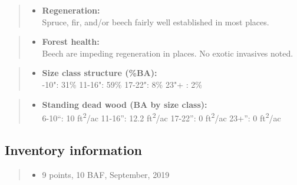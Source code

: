 \documentclass[]{tufte-handout}
\providecommand{\tightlist}{%
  \setlength{\itemsep}{0pt}\setlength{\parskip}{0pt}}
\begin{document}
\begin{quote}
\begin{itemize}
\tightlist
\item
  \textbf{Regeneration:}\\
  \vspace{2pt} Spruce, fir, and/or beech fairly well established in most
  places.
\end{itemize}
\end{quote}

\begin{quote}
\begin{itemize}
\tightlist
\item
  \textbf{Forest health:}\\
  \vspace{2pt} Beech are impeding regeneration in places. No exotic
  invasives noted.
\end{itemize}
\end{quote}

\begin{quote}
\begin{itemize}
\tightlist
\item
  \textbf{Size class structure (\%BA):}\\
  \vspace{2pt} -10": 31\% \textbar{} 11-16": 59\% \textbar{}
  17-22": 8\% \textbar{} 23"+ : 2\%
\end{itemize}
\end{quote}

\begin{quote}
\begin{itemize}
\tightlist
\item
  \textbf{Standing dead wood (BA by size class):}\\
  \vspace{2pt} \indent \small 6-10``: 10 ft\textsuperscript{2}/ac
  \textbar{} 11-16'': 12.2 ft\textsuperscript{2}/ac \textbar{} 17-22'':
  0 ft\textsuperscript{2}/ac \textbar{} 23+'': 0
  ft\textsuperscript{2}/ac
\end{itemize}
\end{quote}

\subsection{Inventory information}\label{inventory-information-4}

\begin{quote}
\begin{itemize}
\tightlist
\item
  9 points, 10 BAF, September, 2019
\end{itemize}
\end{quote}
\end{document}
